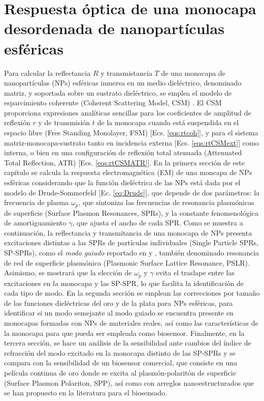 
\chapter{Respuesta óptica de una monocapa desordenada de nanopartículas esféricas}
\label{chapter:Resultados}
\vspace*{5em}

Para calcular la reflectancia $R$ y transmistancia $T$  de una monocapa de nanopartículas (NPs) esféricas inmersa en un medio dieléctrico, denominado matriz, y soportada sobre un sustrato dieléctrico, se emplea el modelo de esparcimiento coherente (Coherent Scattering Model, CSM) \cite{reyes2018analytical,garcia2012multiple}. El CSM proporciona expresiones analíticas sencillas para los coeficientes de amplitud de reflexión $r$ y de transmisión $t$ de la monocapa cuando está suspendida en el espacio libre (Free Standing Monolayer, FSM) [Ecs. \eqref{eqs:rtcoh}], y para el sistema matriz-monocapa-sustrato tanto en incidencia externa [Ecs. \eqref{eqs:rtCSMext}] como interna, o bien en una configuración de reflexión total atenuada  (Attenuated Total Reflection, ATR) [Ecs. \eqref{eqs:rtCSMATR}]. En la primera sección de este capítulo se calcula la respuesta electromagnética (EM) de una moncapa de NPs esféricas considerando que la función dieléctrica de las NPs está dada por el modelo de Drude-Sommerfeld [Ec. \eqref{eq:Drude}], que depende de dos parámetros: la frecuencia de plasma $\omega_p$, que sintoniza las frecuencias de resonancia plasmónicas de superficie (Surface Plasmon Resonances, SPRs), y la constante fenomenológica de amortiguamiento $\gamma$, que ajusta el ancho de cada SPR. Como se muestra a continuación, la reflectancia y transmitancia de una monocapa de NPs presenta excitaciones distintas a las  SPRs de partículas individuales (Single Particle SPRs, SP-SPRs), como el \emph{modo guiado} reportado en \cite{kabashin2009plasmonic} y \cite{danilov2018ultra}, también denominado resonancia de red de superficie plasmónica (Plasmonic Surface Lattice Resonance, PSLR). Asimismo, se mostrará que la elección de $\omega_p$ y $\gamma$ evita el traslape entre las excitaciones en la monocapa y las SP-SPR, lo que facilita la identificación de cada tipo de modo. En la segunda sección se emplean las correcciones por tamaño de las funciones dieléctricas del oro y de la plata para NPs esféricas, para identificar si un modo semejante al modo guiado se encuentra presente en monocapas formadas con NPs de materiales reales, así como las  características de la monocapa para que pueda ser empleada como biosensor. Finalmente, en la tercera sección, se hace un análisis de la sensibilidad ante cambios del índice de refracción del modo excitado en la monocapa distinto de las SP-SPRs  y se compara con la sensibilidad de un biosensor comercial, que consiste en una película continua de oro donde se excita al plasmón-polaritón de superficie (Surface Plasmon Polariton, SPP), así como con arreglos nanoestructurados que se han propuesto en la literatura para el biosensado.

